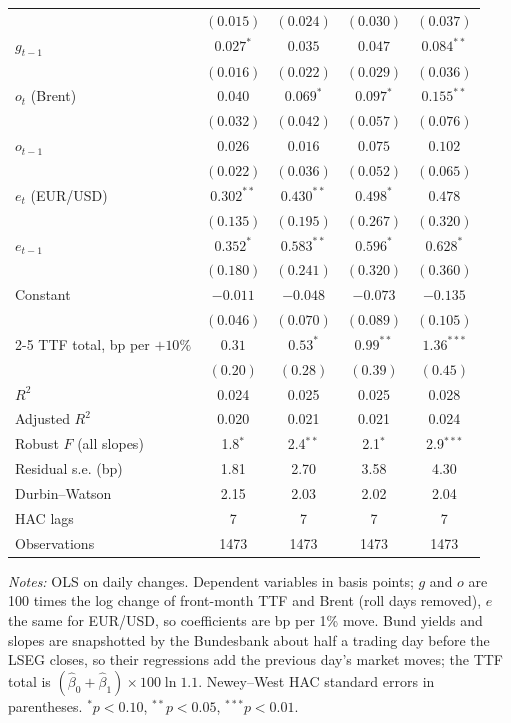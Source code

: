 \documentclass[11pt,a4paper]{article}
\begin{document}
\begin{table}[htbp]
\begin{tabular}{@{}l*{4}{c}@{}}
 & $(0.015)$ & $(0.024)$ & $(0.030)$ & $(0.037)$\\
$g_{t-1}$ & $0.027^{*}$ & $0.035$ & $0.047$ & $0.084^{**}$\\
 & $(0.016)$ & $(0.022)$ & $(0.029)$ & $(0.036)$\\
$o_t$ (Brent) & $0.040$ & $0.069^{*}$ & $0.097^{*}$ & $0.155^{**}$\\
 & $(0.032)$ & $(0.042)$ & $(0.057)$ & $(0.076)$\\
$o_{t-1}$ & $0.026$ & $0.016$ & $0.075$ & $0.102$\\
 & $(0.022)$ & $(0.036)$ & $(0.052)$ & $(0.065)$\\
$e_t$ (EUR/USD) & $0.302^{**}$ & $0.430^{**}$ & $0.498^{*}$ & $0.478$\\
 & $(0.135)$ & $(0.195)$ & $(0.267)$ & $(0.320)$\\
$e_{t-1}$ & $0.352^{*}$ & $0.583^{**}$ & $0.596^{*}$ & $0.628^{*}$\\
 & $(0.180)$ & $(0.241)$ & $(0.320)$ & $(0.360)$\\
Constant & $-0.011$ & $-0.048$ & $-0.073$ & $-0.135$\\
 & $(0.046)$ & $(0.070)$ & $(0.089)$ & $(0.105)$\\
\cmidrule(l){2-5}
TTF total, bp per $+10\%$ & $0.31$ & $0.53^{*}$ & $0.99^{**}$ & $1.36^{***}$\\
 & $(0.20)$ & $(0.28)$ & $(0.39)$ & $(0.45)$\\
$R^2$ & 0.024 & 0.025 & 0.025 & 0.028\\
Adjusted $R^2$ & 0.020 & 0.021 & 0.021 & 0.024\\
Robust $F$ (all slopes) & 1.8$^{*}$ & 2.4$^{**}$ & 2.1$^{*}$ & 2.9$^{***}$\\
Residual s.e. (bp) & 1.81 & 2.70 & 3.58 & 4.30\\
Durbin--Watson & 2.15 & 2.03 & 2.02 & 2.04\\
HAC lags & 7 & 7 & 7 & 7\\
Observations & 1473 & 1473 & 1473 & 1473\\
\bottomrule
\end{tabular}
\par\vspace{4pt}\begin{minipage}{0.94\textwidth}\scriptsize\textit{Notes:} OLS on daily changes. Dependent variables in basis points; $g$ and $o$ are 100 times the log change of front-month TTF and Brent (roll days removed), $e$ the same for EUR/USD, so coefficients are bp per 1\% move. Bund yields and slopes are snapshotted by the Bundesbank about half a trading day before the LSEG closes, so their regressions add the previous day's market moves; the TTF total is $(\hat\beta_0+\hat\beta_1)\times 100\ln 1.1$. Newey--West HAC standard errors in parentheses. $^{*}p<0.10$, $^{**}p<0.05$, $^{***}p<0.01$.\end{minipage}
\end{table}
\end{document}
